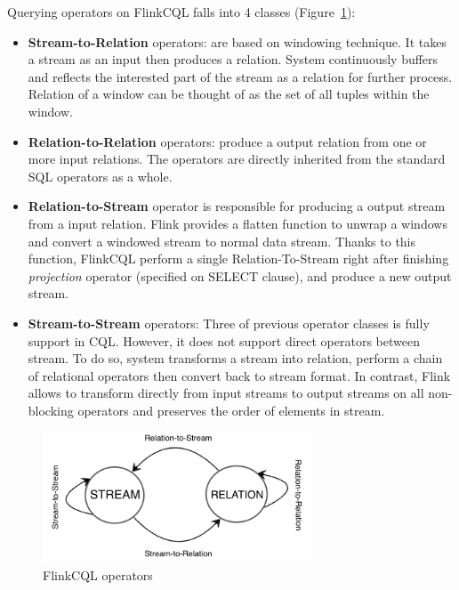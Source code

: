 Querying operators on FlinkCQL falls into 4 classes (Figure~\ref{fig:relation}):
\begin{itemize}
	\item \textbf{Stream-to-Relation} operators: are based on windowing technique. It takes a stream as an input then produces a relation. System continuously buffers and reflects the interested part of the stream as a relation for further process. Relation of a window can be thought of as the set of all tuples within the window.
	\item  \textbf{Relation-to-Relation} operators: produce a output relation from one or more input relations. The operators are directly inherited from the standard SQL operators as a whole.
	\item \textbf{Relation-to-Stream} operator is responsible for producing a output stream from a input relation. Flink provides a flatten function to unwrap a windows and convert a windowed stream to normal data stream. Thanks to this function, FlinkCQL perform a single Relation-To-Stream right after finishing \textit{projection} operator (specified on SELECT clause), and produce a new output stream.
	\item \textbf{Stream-to-Stream} operators: Three of previous operator classes is fully support in CQL. However, it does not support direct operators between stream. To do so, system transforms a stream into relation, perform a chain of relational operators then convert back to stream format. In contrast, Flink allows to transform directly from input streams to output streams on all non-blocking operators and preserves the order of elements in stream.
\end{itemize}
\begin{figure}[h!] 
\centering    
\includegraphics[width=0.7\textwidth]{relation}
\caption{FlinkCQL operators}
\label{fig:relation}
\end{figure}


